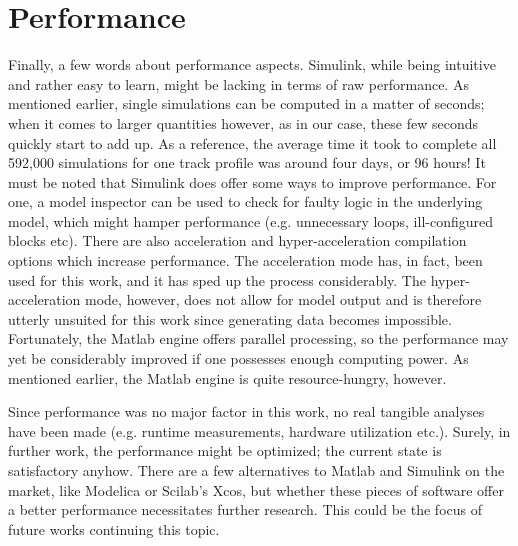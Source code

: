 \section{Performance}
\label{sec:Performance}
\par\noindent
Finally, a few words about performance aspects. Simulink, while being intuitive and rather easy to learn, might be lacking in terms of raw performance. As mentioned earlier, single simulations can be computed in a matter of seconds; when it comes to larger quantities however, as in our case, these few seconds quickly start to add up. As a reference, the average time it took to complete all 592,000 simulations for one track profile was around four days, or 96 hours! It must be noted that Simulink does offer some ways to improve performance. For one, a model inspector can be used to check for faulty logic in the underlying model, which might hamper performance (e.g. unnecessary loops, ill-configured blocks etc). There are also acceleration and hyper-acceleration compilation options which increase performance. The acceleration mode has, in fact, been used for this work, and it has sped up the process considerably. The hyper-acceleration mode, however, does not allow for model output and is therefore utterly unsuited for this work since generating data becomes impossible. Fortunately, the Matlab engine offers parallel processing, so the performance may yet be considerably improved if one possesses enough computing power. As mentioned earlier, the Matlab engine is quite resource-hungry, however. 
\par
Since performance was no major factor in this work, no real tangible analyses have been made (e.g. runtime measurements, hardware utilization etc.). Surely, in further work, the performance might be optimized; the current state is satisfactory anyhow. There are a few alternatives to Matlab and Simulink on the market, like Modelica or Scilab's Xcos, but whether these pieces of software offer a better performance necessitates further research. This could be the focus of future works continuing this topic.